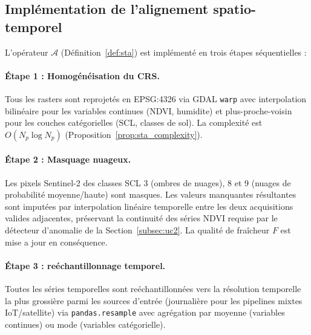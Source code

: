 \documentclass[12pt]{article}
\begin{document}
	\subsection{Implémentation de l'alignement spatio-temporel}
\label{subsec:alignment_impl}

L’opérateur $\mathcal{A}$ (Définition~\ref{def:sta}) est implémenté
en trois étapes séquentielles :

\paragraph{Étape 1 : Homogénéisation du CRS.}
Tous les rasters sont reprojetés en EPSG:4326 via GDAL \texttt{warp}
avec interpolation bilinéaire pour les variables continues (NDVI, humidite)
et plus-proche-voisin pour les couches catégorielles (SCL, classes de sol).
La complexité est $O(N_p \log N_p)$
(Proposition~\ref{prop:sta_complexity}).

\paragraph{Étape 2 : Masquage nuageux.}
Les pixels Sentinel-2 des classes SCL 3 (ombres de nuages), 8 et 9
(nuages de probabilité moyenne/haute) sont masques. Les valeurs
manquantes résultantes sont imputées par interpolation linéaire
temporelle entre les deux acquisitions valides adjacentes, préservant
la continuité des séries NDVI requise par le détecteur d'anomalie
de la Section~\ref{subsec:uc2}. La qualité de fraîcheur $F$ est
mise a jour en conséquence.

\paragraph{Étape 3 : reéchantillonnage temporel.}
Toutes les séries temporelles sont reéchantillonnées vers la
résolution temporelle la plus grossière parmi les sources d’entrée
(journalière pour les pipelines mixtes IoT/satellite) via
\texttt{pandas.resample} avec agrégation par moyenne (variables continues)
ou mode (variables catégorielle).
\end{document}
